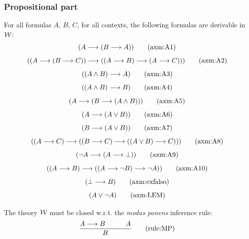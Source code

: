 \subsubsection{Propositional part}
\begin{metaaxiom}%
For all formulas $A$, $B$, $C$, for all contexts,
the following formulas %
are derivable in ${\mathcal{W}}$:
\[
(A \implies (B \implies A)) \labeltagd{axm}{A1}
\]
\[
((A \implies (B \implies C))\implies ((A \implies B) \implies (A \implies C))) \labeltagd{axm}{A2}
\]
\[
((A\land B) \implies A) \labeltagd{axm}{A3}
\]
\[
((A\land B) \implies B)  \labeltagd{axm}{A4}
\]
\[
(A \implies (B\implies (A\land B))) \labeltagd{axm}{A5}
\]
\[
(A \implies (A\lor B)) \labeltagd{axm}{A6}
\]
\[
(B \implies (A\lor B)) \labeltagd{axm}{A7}
\]
\[
((A \implies C)\implies ((B \implies C) \implies ((A\lor B)\implies C)))
\labeltagd{axm}{A8}
\]
\[
(\neg A \implies (A\implies \bot)) \labeltagd{axm}{A9}
\]
\[
((A\implies B)\implies ((A \implies \neg B) \implies \neg A) )
\labeltagd{axm}{A10}
\]
\[
(\bot \implies B) \labeltagd{axm}{exfalso}
\]
\[
(A\lor \neg A) \labeltagd{axm}{LEM}
\]
\end{metaaxiom}
\begin{metaaxiom}
The theory ${\mathcal{W}}$ must be closed w.r.t. the \textit{modus ponens} inference rule:
\[
\frac{
A \implies B\quad\quad\quad A
}{
B
}
\labeltag{rule:MP}
\]
\end{metaaxiom}
